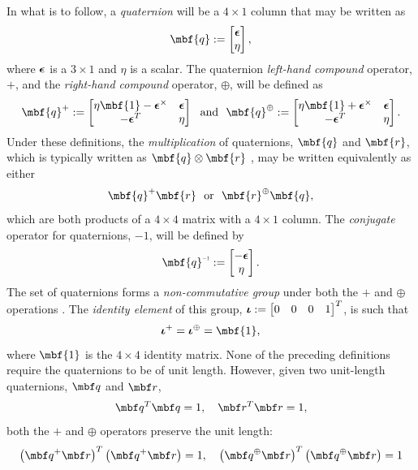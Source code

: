 \documentclass[11pt,a4,oneside]{article}
\begin{document}
In what is to follow, a {\em quaternion} will be a $4 \times 1$
column that may be written as
\begin{equation}
\mbf{q} := \bbm \mbs{\ep} \\ \eta \ebm,
\end{equation}
where ${\boldsymbol{\epsilon}}$ is a $3 \times 1$ and $\eta$ is a scalar.  The
quaternion {\em left-hand compound} operator, $+$, and the {\em right-hand
compound} operator, $\oplus$, will be defined as
\begin{equation}
  \label{eq:quatplus}
\qc{\mbf{q}} := \bbm \eta\mbf{1} - \mbs{\ep}^\times & \mbs{\ep} \\
-\mbs{\ep}^T & \eta \ebm \mbox{~~and~~} \qo{\mbf{q}}
:= \bbm \eta\mbf{1} + \mbs{\ep}^\times & \mbs{\ep} \\
-\mbs{\ep}^T & \eta \ebm.
\end{equation}
Under these definitions, the {\em multiplication} of quaternions, $\mbf{q}$ and $\mbf{r}$, which is typically written as $\mbf{q} \otimes \mbf{r}$ \citep{shuster93}, may be written equivalently as either
\begin{equation}
  \label{eq:quat-plusoplus}
\qc{\mbf{q}} \mbf{r} \mbox{~~or~~} \qo{\mbf{r}}\mbf{q},
\end{equation}
which are both products of a $4 \times 4$ matrix with a $4 \times 1$ column. 
The {\em conjugate} operator for quaternions, $-1$, will be defined by
\begin{equation}
\qi{\mbf{q}} := \bbm -\mbs{\ep} \\ \eta \ebm.
\end{equation}
The set of quaternions forms a {\em non-commutative group} under both the $+$ and $\oplus$ operations \citep{shuster93}.  
The {\em identity element} of this group,
${\boldsymbol{\iota}} := \begin{bmatrix} 0 & 0 & 0 & 1 \end{bmatrix}^T$, is such that
\begin{equation}
\qc{\mbs{\iota}} = \qo{\mbs{\iota}} = \mbf{1},
\end{equation}
where $\mbf{1}$ is the $4 \times 4$ identity matrix. None of the preceding definitions require the quaternions to be of unit length.
However, given two unit-length quaternions, $\mbf q$ and $\mbf r$, 
\begin{equation}
  \label{eq:unit-len}
  \mbf q^T \mbf q = 1, \quad \mbf r^T \mbf r = 1,
\end{equation}
both the $+$ and $\oplus$ operators preserve the unit length:
\begin{equation}
  \label{eq:unit-length}
  \left(\qc{\mbf q}\mbf r \right)^T\left(\qc{\mbf q}\mbf r\right) = 1, \quad   \left(\qo{\mbf q}\mbf r \right)^T\left(\qo{\mbf q}\mbf r\right) = 1
\end{equation}
\end{document}
